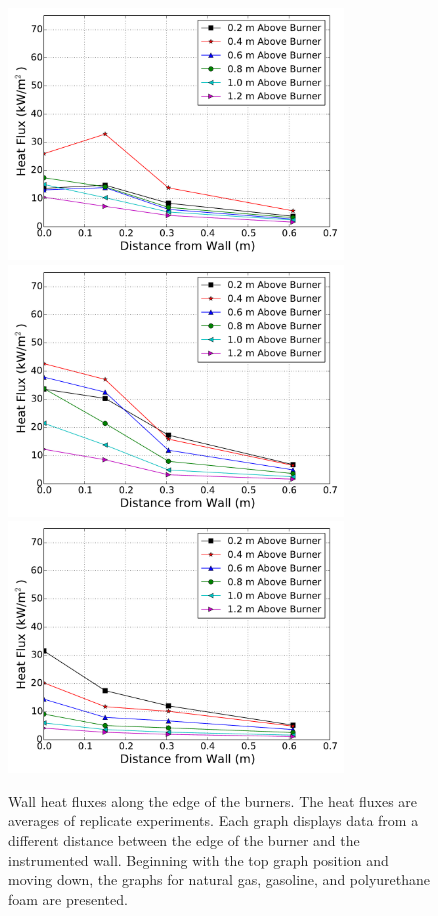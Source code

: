 \documentclass[twoside]{uocthesis}
\begin{document}
{\begin{figure}[p]
	\centering
	\includegraphics[width=3.5in]{../Figures/NCTW_NG_HF_Offset_Avg} \\
	\includegraphics[width=3.5in]{../Figures/NCTW_GAS_HF_Offset_Avg}\\
	\includegraphics[width=3.5in]{../Figures/NCTW_PUF_HF_Offset_Avg} \\
	\caption[Wall heat flux along the edge of the burners]{Wall heat fluxes along the edge of the burners.  The heat fluxes are averages of replicate experiments. Each graph displays data from a different distance between the edge of the burner and the instrumented wall.  Beginning with the top graph position and moving down, the graphs for natural gas, gasoline, and polyurethane foam are presented.}
	\label{NCTW_HF_Edge_Comp}
\end{figure}

}
\end{document}

